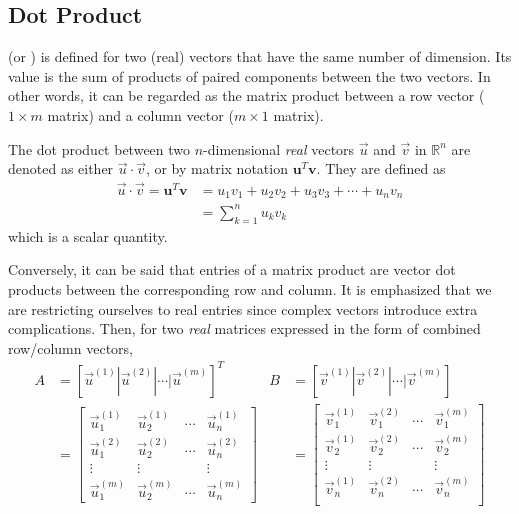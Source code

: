 \subsection{Dot Product}
 (or ) is defined for two (real) vectors that have the same number of dimension. Its value is the sum of products of paired components between the two vectors. In other words, it can be regarded as the matrix product between a row vector ($1 \times m$ matrix) and a column vector ($m \times 1$ matrix). 
\begin{defn}
\label{defn:dotreal}
The dot product between two $n$-dimensional \textit{real} vectors $\vec{u}$ and $\vec{v}$ in $\mathbb{R}^n$ are denoted as either $\vec{u} \cdot \vec{v}$, or by matrix notation $\textbf{u}^T\textbf{v}$. They are defined as
\begin{align*}
\vec{u} \cdot \vec{v} = \textbf{u}^T\textbf{v} &= u_1v_1 + u_2v_2 + u_3v_3 + \cdots + u_nv_n \\
&= \sum_{k=1}^{n} u_kv_k
\end{align*}
which is a scalar quantity.
\end{defn}
Conversely, it can be said that entries of a matrix product are vector dot products between the corresponding row and column. It is emphasized that we are restricting ourselves to real entries since complex vectors introduce extra complications. Then, for two \textit{real} matrices expressed in the form of combined row/column vectors,
\begin{align*}
A &= [\vec{u}^{(1)}|\vec{u}^{(2)}|\cdots|\vec{u}^{(m)}]^T 
& B &= [\vec{v}^{(1)}|\vec{v}^{(2)}|\cdots|\vec{v}^{(m)}]\\
&= 
\begin{bmatrix}
\vec{u}^{(1)}_1  & \vec{u}^{(1)}_2 & \cdots & \vec{u}^{(1)}_n \\
\vec{u}^{(2)}_1  & \vec{u}^{(2)}_2 & \cdots & \vec{u}^{(2)}_n \\
\vdots & \vdots & & \vdots \\
\vec{u}^{(m)}_1  & \vec{u}^{(m)}_2 & \cdots & \vec{u}^{(m)}_n
\end{bmatrix} 
& &= 
\begin{bmatrix}
\vec{v}^{(1)}_1  & \vec{v}^{(2)}_1 & \cdots & \vec{v}^{(m)}_1 \\
\vec{v}^{(1)}_2  & \vec{v}^{(2)}_2 & \cdots & \vec{v}^{(m)}_2 \\
\vdots & \vdots & & \vdots \\
\vec{v}^{(1)}_n  & \vec{v}^{(2)}_n & \cdots & \vec{v}^{(m)}_n \\
\end{bmatrix} 
\end{align*}
